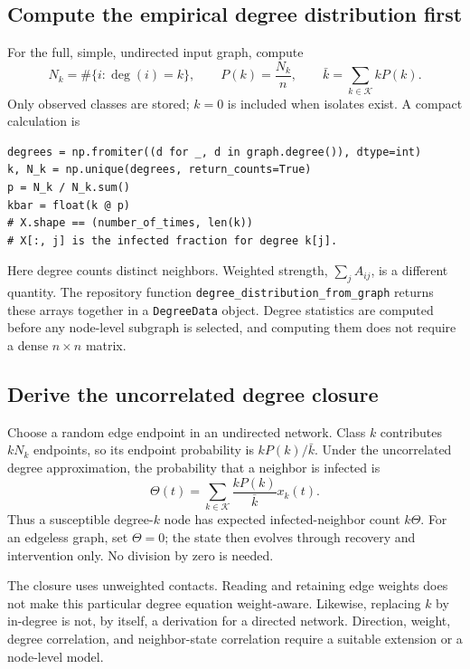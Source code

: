 \documentclass[11pt,a4paper]{article}
\theoremstyle{definition}
\theoremstyle{remark}
\begin{document}
\subsection{Compute the empirical degree distribution first}
For the full, simple, undirected input graph, compute
\begin{equation}
N_k=\#\{i:\deg(i)=k\},\qquad P(k)=\frac{N_k}{n},\qquad
\bar k=\sum_{k\in\mathcal K}kP(k).
\label{eq:degree-distribution}
\end{equation}
Only observed classes are stored; $k=0$ is included when isolates exist. A compact calculation is
\begin{lstlisting}[caption={Degree classes are columns of the state array}]
degrees = np.fromiter((d for _, d in graph.degree()), dtype=int)
k, N_k = np.unique(degrees, return_counts=True)
p = N_k / N_k.sum()
kbar = float(k @ p)
# X.shape == (number_of_times, len(k))
# X[:, j] is the infected fraction for degree k[j].
\end{lstlisting}
Here degree counts distinct neighbors. Weighted strength, $\sum_j A_{ij}$, is a different quantity. The repository function \texttt{degree\_distribution\_from\_graph} returns these arrays together in a \texttt{DegreeData} object. Degree statistics are computed before any node-level subgraph is selected, and computing them does not require a dense $n\times n$ matrix.

\subsection{Derive the uncorrelated degree closure}
Choose a random edge endpoint in an undirected network. Class $k$ contributes $kN_k$ endpoints, so its endpoint probability is $kP(k)/\bar k$. Under the uncorrelated degree approximation, the probability that a neighbor is infected is
\begin{equation}
\Theta(t)=\sum_{k\in\mathcal K}\frac{kP(k)}{\bar k}x_k(t).
\label{eq:theta}
\end{equation}
Thus a susceptible degree-$k$ node has expected infected-neighbor count $k\Theta$. For an edgeless graph, set $\Theta=0$; the state then evolves through recovery and intervention only. No division by zero is needed.

The closure uses unweighted contacts. Reading and retaining edge weights does not make this particular degree equation weight-aware. Likewise, replacing $k$ by in-degree is not, by itself, a derivation for a directed network. Direction, weight, degree correlation, and neighbor-state correlation require a suitable extension or a node-level model.
\end{document}
